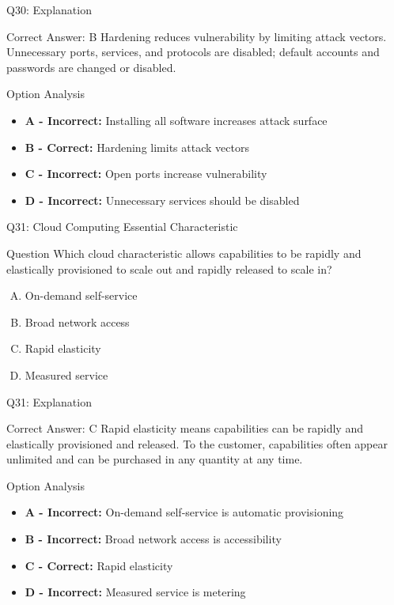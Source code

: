 \documentclass{beamer}
\begin{document}
	\begin{frame}{Q30: Explanation}
		\begin{block}{Correct Answer: B}
			Hardening reduces vulnerability by limiting attack vectors. Unnecessary ports, services, and protocols are disabled; default accounts and passwords are changed or disabled.
		\end{block}
		\begin{block}{Option Analysis}
			\begin{itemize}
				\item \textbf{A - Incorrect:} Installing all software increases attack surface
				\item \textbf{B - Correct:} Hardening limits attack vectors
				\item \textbf{C - Incorrect:} Open ports increase vulnerability
				\item \textbf{D - Incorrect:} Unnecessary services should be disabled
			\end{itemize}
		\end{block}
	\end{frame}
	
	\begin{frame}{Q31: Cloud Computing Essential Characteristic}
		\begin{block}{Question}
			Which cloud characteristic allows capabilities to be rapidly and elastically provisioned to scale out and rapidly released to scale in?
		\end{block}
		\begin{enumerate}[(A)]
			\item On-demand self-service
			\item Broad network access
			\item Rapid elasticity
			\item Measured service
		\end{enumerate}
	\end{frame}
	
	\begin{frame}{Q31: Explanation}
		\begin{block}{Correct Answer: C}
			Rapid elasticity means capabilities can be rapidly and elastically provisioned and released. To the customer, capabilities often appear unlimited and can be purchased in any quantity at any time.
		\end{block}
		\begin{block}{Option Analysis}
			\begin{itemize}
				\item \textbf{A - Incorrect:} On-demand self-service is automatic provisioning
				\item \textbf{B - Incorrect:} Broad network access is accessibility
				\item \textbf{C - Correct:} Rapid elasticity
				\item \textbf{D - Incorrect:} Measured service is metering
			\end{itemize}
		\end{block}
	\end{frame}
	
\end{document}
